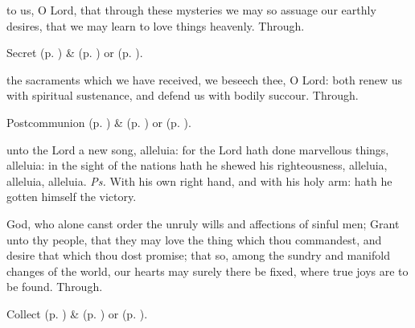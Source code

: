 \secret
{} to us, O Lord, that through these mysteries we may so assuage our earthly desires, that we may learn to love things heavenly. Through.


\begin{rubric}
     Secret  (p. \pageref{SPMaryInEaster}) \&   (p. \pageref{SPAgainst}) or  (p. \pageref{SPChiefBishop}).
\end{rubric}
\postcommunion
{} the sacraments which we have received, we beseech thee, O Lord: both renew us with spiritual sustenance, and defend us with bodily succour. Through.
\begin{rubric}
     Postcommunion  (p. \pageref{SPMaryInEaster}) \&   (p. \pageref{SPAgainst}) or  (p. \pageref{SPChiefBishop}).
\end{rubric}


\clearpage
{}


\introit
{} unto the Lord a new song, alleluia: for the Lord hath done marvellous things, alleluia: in the sight of the nations hath he shewed his righteousness, alleluia, alleluia, alleluia. \textit{Ps.} With his own right hand, and with his holy arm: hath he gotten himself the victory.

\collect
{} God, who alone canst order the unruly wills and affections of sinful men; Grant unto thy people, that they may love the thing which thou commandest, and desire that which thou dost promise; that so, among the sundry and manifold changes of the world, our hearts may surely there be fixed, where true joys are to be found. Through.
\begin{rubric}
     Collect  (p. \pageref{SPMaryInEaster}) \&   (p. \pageref{SPAgainst}) or  (p. \pageref{SPChiefBishop}).
\end{rubric}

